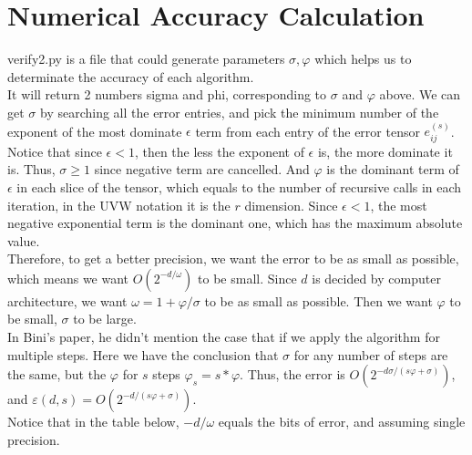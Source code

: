 \documentclass{article}
\begin{document}
\section{Numerical Accuracy Calculation}
verify2.py is a file that could generate parameters $\sigma, \varphi$ which helps us to determinate the accuracy of each algorithm. \\
It will return 2 numbers sigma and phi, corresponding to $\sigma$ and $\varphi$ above. We can get $\sigma$ by searching all the error entries, and pick the minimum number of the exponent of the most dominate $\epsilon$ term from each entry of the error tensor $e_{ij}^{(s)}$. Notice that since $\epsilon < 1$, then the less the exponent of $\epsilon$ is, the more dominate it is. Thus, $\sigma \geq 1$ since negative term are cancelled. And $\varphi$ is the dominant term of $\epsilon$ in each slice of the tensor, which equals to the number of recursive calls in each iteration, in the UVW notation it is the $r$ dimension. Since $\epsilon < 1$, the most negative exponential term is the dominant one, which has the maximum absolute value.\\
Therefore, to get a better precision, we want the error to be as small as possible, which means we want $O(2^{-d/\omega})$ to be small. Since $d$ is decided by computer architecture, we want $\omega = 1+\varphi / \sigma$ to be as small as possible. Then we want $\varphi$ to be small, $\sigma$ to be large.\\
In Bini's paper, he didn't mention the case that if we apply the algorithm for multiple steps. Here we have the conclusion that $\sigma$ for any number of steps are the same, but the $\varphi$ for $s$ steps $\varphi_s = s * \varphi$. Thus, the error is $O(2^{-d\sigma/(s\varphi + \sigma)})$, and $\varepsilon (d,s) = O(2^{-d/(s\varphi + \sigma)})$.\\
Notice that in the table below, $-d/\omega$ equals the bits of error, and assuming single precision. 
\end{document}
